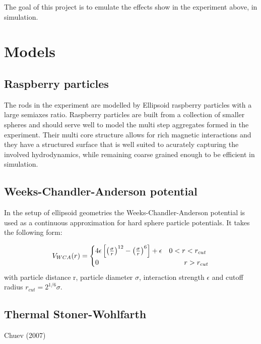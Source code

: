 \documentclass[12pt, DIV=12]{scrartcl}
\begin{document}
The goal of this project is to emulate the effects show in the experiment above, in simulation.

\section{Models}

\subsection{Raspberry particles}
The rods in the experiment are modelled by Ellipsoid raspberry particles with a large semiaxes ratio.
Raspberry particles are built from a collection of smaller spheres and should serve well to model the multi step aggregates formed in the experiment. Their multi core structure allows for rich magnetic interactions and they have a structured surface that is well suited to acurately capturing the involved hydrodynamics, while remaining coarse grained enough to be efficient in simulation.


\subsection{Weeks-Chandler-Anderson potential}
In the setup of ellipsoid geometries the Weeks-Chandler-Anderson potential is used as a continuous approximation for hard sphere particle potentials. It takes the following form:

\begin{equation}
    V_{WCA}(r) =
    \begin{cases}
        4\epsilon\left[\left(\frac{\sigma}{r}\right)^{12} - \left(\frac{\sigma}{r}\right)^{6}\right] + \epsilon & 0<r<r_{cut}                \\
        0                                                                                                       & \hspace{0.75cm}r > r_{cut} \\
    \end{cases}
    \label{eqn_WCA}
\end{equation}
with particle distance r, particle diameter $\sigma$, interaction  strength $\epsilon$ and cutoff radius $r_{cut} = 2^{1/6} \sigma$.

\subsection{Thermal Stoner-Wohlfarth}

Chuev (2007) \cite{Chuev2007}
\end{document}

